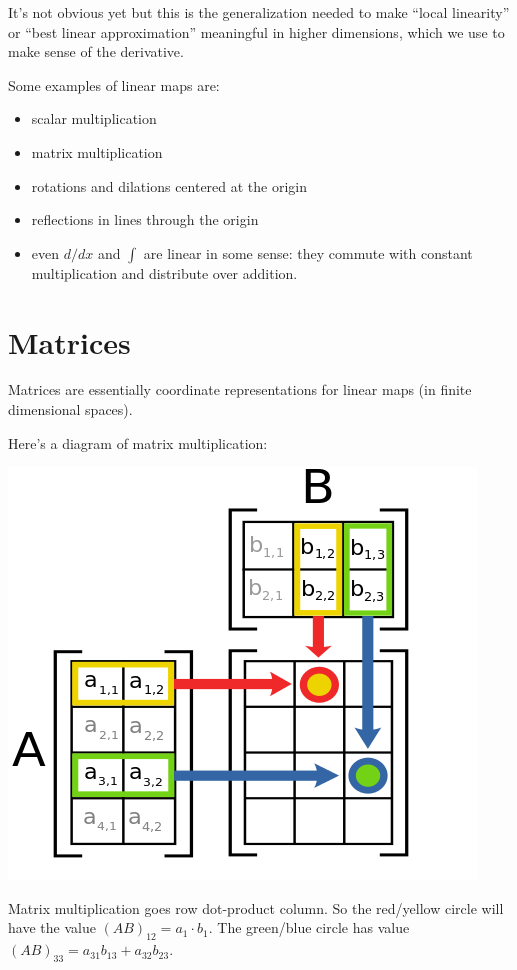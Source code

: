 \documentclass{scrartcl}
\begin{document}
It's not obvious yet but this is the generalization needed to make ``local
linearity'' or ``best linear approximation'' meaningful in higher dimensions,
which we use to make sense of the derivative.

Some examples of linear maps are:
\begin{itemize}
\item scalar multiplication
\item matrix multiplication
\item rotations and dilations centered at the origin
\item reflections in lines through the origin
\item even $d/dx$ and $\int$ are linear in some sense: they
  commute with constant multiplication and distribute over addition.
\end{itemize}

\section{Matrices}
Matrices are essentially coordinate representations for linear maps (in finite
dimensional spaces).

Here's a diagram of matrix multiplication:

\includegraphics[width=\textwidth]{matrix-mult.png}

Matrix multiplication goes row dot-product column. So the red/yellow circle will
have the value $(AB)_{12}=a_1\cdot b_1$. The green/blue circle has value
$(AB)_{33}=a_{31}b_{13}+a_{32}b_{23}$.
\end{document}
